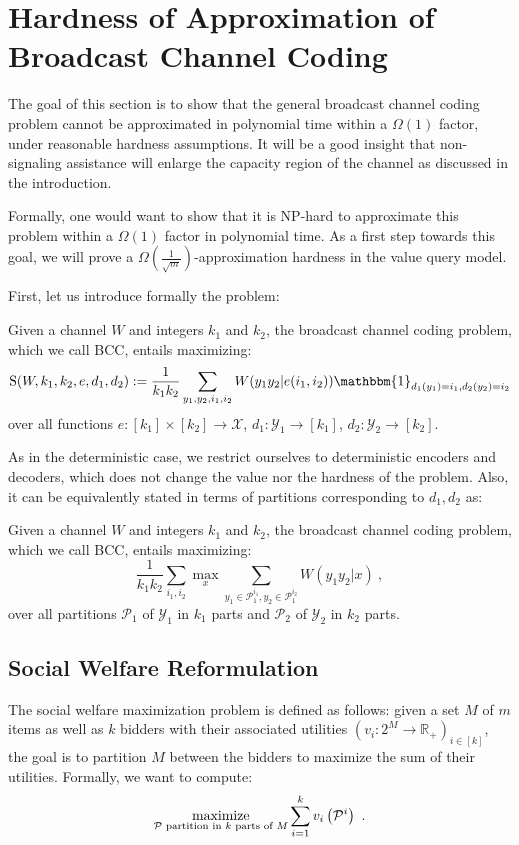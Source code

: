 \section{Hardness of Approximation of Broadcast Channel Coding}
\label{section:HardnessBC}
The goal of this section is to show that the general broadcast channel coding problem cannot be approximated in polynomial time within a $\Omega(1)$ factor, under reasonable hardness assumptions. It will be a good insight that non-signaling assistance will enlarge the capacity region of the channel as discussed in the introduction.

Formally, one would want to show that it is \textrm{NP}-hard to approximate this problem within a $\Omega(1)$ factor in polynomial time. As a first step towards this goal, we will prove a $\Omega\left(\frac{1}{\sqrt{m}}\right)$-approximation hardness in the value query model.

First, let us introduce formally the problem:
\begin{definition}
  Given a channel $W$ and integers $k_1$ and $k_2$, the broadcast channel coding problem, which we call \textsc{BCC}, entails maximizing:
  \[ \mathrm{S}(W,k_1,k_2,e,d_1,d_2) := \frac{1}{k_1k_2}\sum_{y_1,y_2,i_1,i_2} W(y_1y_2|e(i_1,i_2))\mathbbm{1}_{d_1(y_1)=i_1, d_2(y_2)=i_2}\]
  over all functions $e : [k_1] \times [k_2] \rightarrow \mathcal{X}$, $d_1 : \mathcal{Y}_1 \rightarrow [k_1]$,  $d_2 : \mathcal{Y}_2 \rightarrow [k_2]$.
\end{definition}

As in the deterministic case, we restrict ourselves to deterministic encoders and decoders, which does not change the value nor the hardness of the problem. Also, it can be equivalently stated in terms of partitions corresponding to $d_1,d_2$ as:
\begin{proposition}
  Given a channel $W$ and integers $k_1$ and $k_2$, the broadcast channel coding problem, which we call \textsc{BCC}, entails maximizing:
  \[ \frac{1}{k_1k_2}\sum_{i_1,i_2} \max_x \sum_{y_1 \in \mathcal{P}_1^{i_1}, y_2 \in \mathcal{P}_1^{i_2}} W(y_1y_2|x) \ , \]
  over all partitions $\mathcal{P}_1$ of $\mathcal{Y}_1$ in $k_1$ parts and $\mathcal{P}_2$ of $\mathcal{Y}_2$ in $k_2$ parts.
\end{proposition}


\subsection{Social Welfare Reformulation}
The social welfare maximization problem is defined as follows: given a set $M$ of $m$ items as well as $k$ bidders with their associated utilities $\left(v_i : 2^M \rightarrow \mathbb{R}_+\right)_{i \in [k]}$, the goal is to partition $M$ between the bidders to maximize the sum of their utilities. Formally, we want to compute:
 \[ \underset{\mathcal{P} \text{ partition in $k$ parts of } M}{\operatorname{\text{maximize}}}\sum_{i=1}^k v_i\left(\mathcal{P}^i\right) \ . \]

